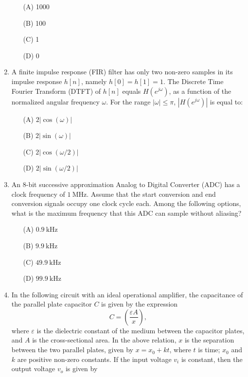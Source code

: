 \documentclass[journal]{IEEEtran}
\begin{document}
\begin{enumerate}
\begin{enumerate}
    \item[(A)] 1000
    \item[(B)] 100
    \item[(C)] 1
    \item[(D)] 0
\end{enumerate}
\hfill{}

\item 
A finite impulse response (FIR) filter has only two non-zero samples in its impulse response \( h[n] \), namely \( h[0] = h[1] = 1 \). The Discrete Time Fourier Transform (DTFT) of \( h[n] \) equals \( H(e^{j\omega}) \), as a function of the normalized angular frequency \( \omega \). For the range \( |\omega| \leq \pi \), \( |H(e^{j\omega})| \) is equal to:

\begin{enumerate}
    \item[(A)] \( 2|\cos(\omega)| \)
    \item[(B)] \( 2|\sin(\omega)| \)
    \item[(C)] \( 2|\cos(\omega/2)| \)
    \item[(D)] \( 2|\sin(\omega/2)| \)
\end{enumerate}
\hfill{}

\item 
An 8-bit successive approximation Analog to Digital Converter (ADC) has a clock frequency of \( 1~\text{MHz} \). Assume that the start conversion and end conversion signals occupy one clock cycle each. Among the following options, what is the maximum frequency that this ADC can sample without aliasing?

\begin{enumerate}
    \item[(A)] \( 0.9~\text{kHz} \)
    \item[(B)] \( 9.9~\text{kHz} \)
    \item[(C)] \( 49.9~\text{kHz} \)
    \item[(D)] \( 99.9~\text{kHz} \)
\end{enumerate}
\hfill{}

\item 
In the following circuit with an ideal operational amplifier, the capacitance of the parallel plate capacitor \( C \) is given by the expression 
\[
C = \left(\frac{\varepsilon A}{x}\right),
\]
where \( \varepsilon \) is the dielectric constant of the medium between the capacitor plates, and \( A \) is the cross-sectional area. In the above relation, \( x \) is the separation between the two parallel plates, given by \( x = x_0 + kt \), where \( t \) is time; \( x_0 \) and \( k \) are positive non-zero constants. If the input voltage \( v_i \) is constant, then the output voltage \( v_o \) is given by


\end{enumerate}
\end{document}
